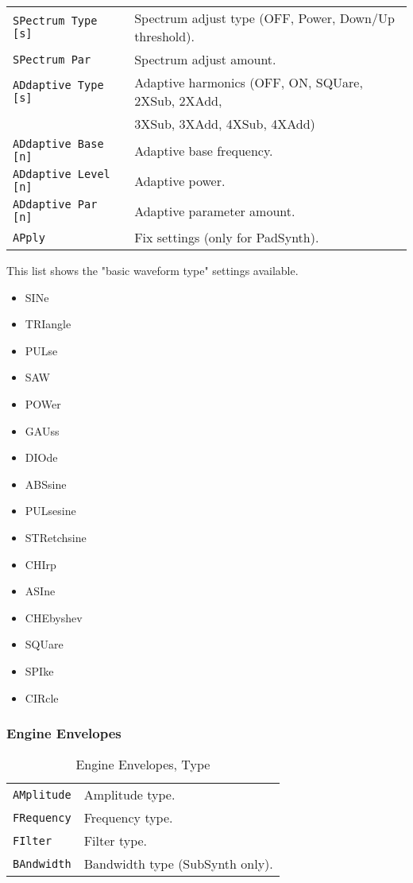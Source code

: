 \begin{table}[H]
\begin{tabular}{l l}
   \texttt{SPectrum Type [s]} &
       Spectrum adjust type (OFF, Power, Down/Up threshold). \\
   \texttt{SPectrum Par } &
      Spectrum adjust amount. \\
   \texttt{ADdaptive Type [s]} &
      Adaptive harmonics (OFF, ON, SQUare, 2XSub, 2XAdd, \\
   \texttt{} &
       3XSub, 3XAdd, 4XSub, 4XAdd) \\
   \texttt{ADdaptive Base [n]} &
      Adaptive base frequency. \\
   \texttt{ADdaptive Level [n]} &
      Adaptive power. \\
   \texttt{ADdaptive Par [n]} &
      Adaptive parameter amount. \\

   \texttt{APply} &
      Fix settings (only for PadSynth). \\
      \end{tabular}
   \end{table}

   This list shows the "basic waveform type" settings available.

   \begin{itemize}
      \item SINe
      \item TRIangle
      \item PULse
      \item SAW
      \item POWer
      \item GAUss
      \item DIOde
      \item ABSsine
      \item PULsesine
      \item STRetchsine
      \item CHIrp
      \item ASIne
      \item CHEbyshev
      \item SQUare
      \item SPIke
      \item CIRcle
   \end{itemize}

\subsubsection{Engine Envelopes}
\label{subsec:command_line_engine_envelopes}

   \begin{table}[H]
      \centering
      \caption{Engine Envelopes, Type}
      \label{table:yoshimi_engine_envelopes_types}
      \begin{tabular}{l l}
\texttt{AMplitude} &
   Amplitude type. \\
\texttt{FRequency} &
   Frequency type. \\
\texttt{FIlter} &
   Filter type. \\
\texttt{BAndwidth} &
   Bandwidth type (SubSynth only). \\
      \end{tabular}
   \end{table}

